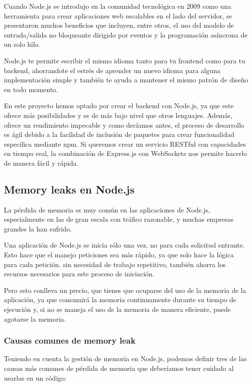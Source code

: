Cuando Node.js se introdujo en la comunidad tecnológica en 2009 como una herramienta para crear aplicaciones web escalables en el lado del servidor, se presentaron muchos beneficios que incluyen, entre otros, el uso del modelo de entrada/salida no bloqueante dirigido por eventos y la programación asíncrona de un solo hilo.

Node.js te permite escribir el mismo idioma tanto para tu frontend como para tu backend, ahorrandote el estrés de aprender un nuevo idioma para alguna implementación simple y también te ayuda a mantener el mismo patrón de diseño en todo momento.

En este proyecto hemos optado por crear el backend con Node.js, ya que este ofrece más posibilidades y es de más bajo nivel que otros lenguajes. Además, ofrece un rendimiento impecable y como decíamos antes, el proceso de desarrollo es ágil debido a la facilidad de inclusión de paquetes para crear funcionalidad específica mediante npm. Si queremos crear un servicio RESTful con capacidades en tiempo real, la combinación de Express.js con WebSockets nos permite hacerlo de manera fácil y rápida.

\subsection{Memory leaks en Node.js}

La pérdida de memoria es muy común en las aplicaciones de Node.js, especialmente en las de gran escala con tráfico razonable, y muchas empresas grandes la han sufrido.

Una aplicación de Node.js se inicia sólo una vez, no para cada solicitud entrante. Esto hace que el manejo peticiones sea más rápido, ya que solo hace la lógica para cada petición. sin necesidad de trabajo repetitivo, también ahorra los recursos necesarios para este proceso de iniciación.

Pero esto conlleva un precio, que tienes que ocuparse del uso de la memoria de la aplicación, ya que consumirá la memoria continuamente durante su tiempo de ejecución y, si no se maneja el uso de la memoria de manera eficiente, puede agotarse la memoria.

\subsubsection{Causas comunes de memory leak}

Teniendo en cuenta la gestión de memoria en Node.js, podemos definir tres de las causas más comunes de pérdida de memoria que deberíamos tener cuidado al usarlas en un código:

